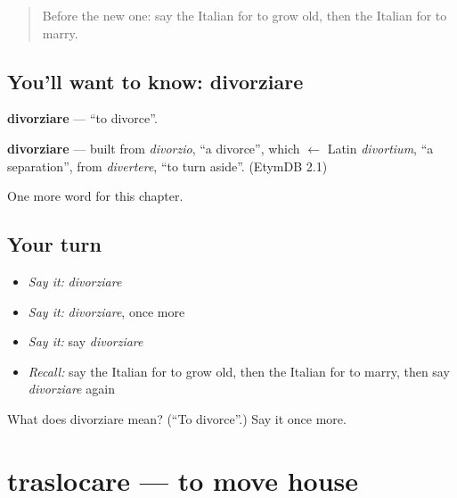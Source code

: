 \label{lesson:IT-C207-divorziare}



\begin{quote}
Before the new one: say the Italian for to grow old, then the Italian for to marry.
\end{quote}

\subsection*{You'll want to know: divorziare}
\textbf{divorziare} — \textquotedblleft{}to divorce\textquotedblright{}.

\begin{cousinweb}
\textbf{divorziare} — built from \emph{divorzio}, \textquotedblleft{}a divorce\textquotedblright{}, which $\leftarrow$ Latin \emph{divortium}, \textquotedblleft{}a separation\textquotedblright{}, from \emph{divertere}, \textquotedblleft{}to turn aside\textquotedblright{}. (EtymDB 2.1)
\end{cousinweb}

\begin{grammarlens}[title={What you've built}]
One more word for this chapter.
\end{grammarlens}

\subsection*{Your turn}
\begin{itemize}
\raggedright
  \item \emph{Say it:} \emph{divorziare}
  \item \emph{Say it:} \emph{divorziare}, once more
  \item \emph{Say it:} say \emph{divorziare}
  \item \emph{Recall:} say the Italian for to grow old, then the Italian for to marry, then say \emph{divorziare} again
\end{itemize}

\begin{tcolorbox}[breakable,colback=teal!4,colframe=teal!35!black,title={Before you move on}]
What does divorziare mean? (\textquotedblleft{}To divorce\textquotedblright{}.) Say it once more.
\end{tcolorbox}
\section[traslocare]{traslocare — to move house}


